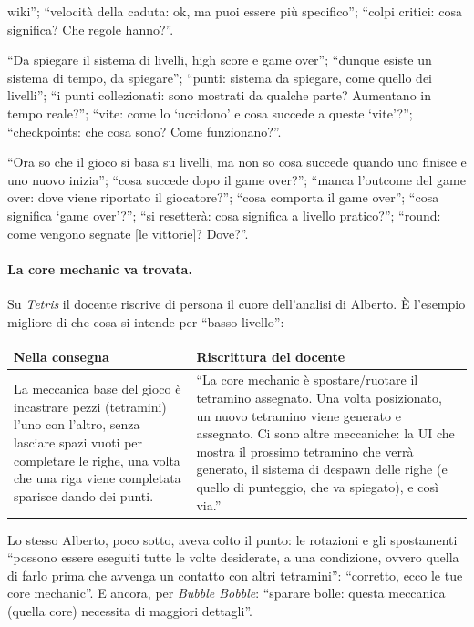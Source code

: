 \begin{description}
        wiki''; ``velocità della caduta: ok, ma puoi essere più specifico'';
        ``colpi critici: cosa significa? Che regole hanno?''.
  \item[Sistemi] ``Da spiegare il sistema di livelli, high score e game
        over''; ``dunque esiste un sistema di tempo, da spiegare'';
        ``punti: sistema da spiegare, come quello dei livelli''; ``i punti
        collezionati: sono mostrati da qualche parte? Aumentano in tempo
        reale?''; ``vite: come lo `uccidono' e cosa succede a queste
        `vite'?''; ``checkpoints: che cosa sono? Come funzionano?''.
  \item[Esiti] ``Ora so che il gioco si basa su livelli, ma non so cosa
        succede quando uno finisce e uno nuovo inizia''; ``cosa succede dopo
        il game over?''; ``manca l'outcome del game over: dove viene
        riportato il giocatore?''; ``cosa comporta il game over''; ``cosa
        significa `game over'?''; ``si resetterà: cosa significa a livello
        pratico?''; ``round: come vengono segnate [le vittorie]? Dove?''.
\end{description}

\paragraph{La core mechanic va trovata.} Su \emph{Tetris} il docente
riscrive di persona il cuore dell'analisi di Alberto. È l'esempio migliore di
che cosa si intende per ``basso livello'':

\begin{center}
\small
\begin{tabular}{@{}p{}p{}@{}}
  \toprule
  \textbf{Nella consegna} & \textbf{Riscrittura del docente} \\
  \midrule
  La meccanica base del gioco è incastrare pezzi (tetramini) l'uno con
  l'altro, senza lasciare spazi vuoti per completare le righe, una volta che
  una riga viene completata sparisce dando dei punti.
  &
  ``La core mechanic è spostare/ruotare il tetramino assegnato. Una volta
  posizionato, un nuovo tetramino viene generato e assegnato. Ci sono altre
  meccaniche: la UI che mostra il prossimo tetramino che verrà generato, il
  sistema di despawn delle righe (e quello di punteggio, che va spiegato), e
  così via.'' \\
  \bottomrule
\end{tabular}
\end{center}

\noindent Lo stesso Alberto, poco sotto, aveva colto il punto: le rotazioni e
gli spostamenti ``possono essere eseguiti tutte le volte desiderate, a una
condizione, ovvero quella di farlo prima che avvenga un contatto con altri
tetramini'': ``corretto, ecco le tue core mechanic''. E ancora, per
\emph{Bubble Bobble}: ``sparare bolle: questa meccanica (quella core)
necessita di maggiori dettagli''.

